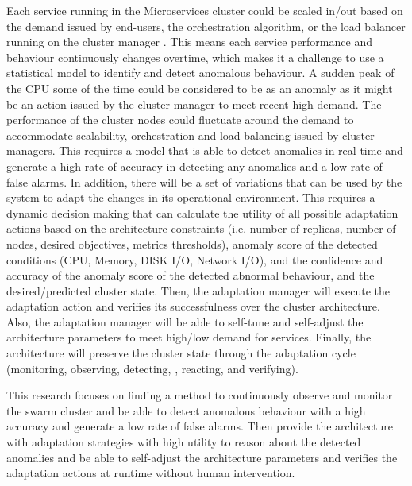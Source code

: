 \documentclass[sigconf]{acmart}
\begin{document}
Each service running in the Microservices cluster could be scaled in/out based on the demand issued by end-users, the orchestration algorithm, or the load balancer running on the cluster manager \cite{stubbs2015distributed}. This means each service performance and behaviour continuously changes overtime, which makes it a challenge to use a statistical model to identify and detect anomalous behaviour. A sudden peak of the CPU some of the time could be considered to be as an anomaly as it might be an action issued by the cluster manager to meet recent high demand. The performance of the cluster nodes could fluctuate around the demand to accommodate scalability, orchestration and load balancing issued by cluster managers. This requires a model that is able to detect anomalies in real-time and generate a high rate of accuracy in detecting any anomalies and a low rate of false alarms. In addition, there will be a set of variations that can be used by the system to adapt the changes in its operational environment. This requires a dynamic decision making that can calculate the utility of all possible adaptation actions based on the architecture constraints (i.e. number of replicas, number of nodes, desired objectives, metrics thresholds), anomaly score of the detected conditions (CPU, Memory, DISK I/O, Network I/O), and the confidence and accuracy of the anomaly score of the detected abnormal behaviour, and the desired/predicted cluster state. Then, the adaptation manager will execute the adaptation action and verifies its successfulness over the cluster architecture. Also, the adaptation manager will be able to self-tune and self-adjust the architecture parameters to meet high/low demand for services. Finally, the architecture will preserve the cluster state through the adaptation cycle (monitoring, observing, detecting, , reacting, and verifying).

 This research focuses on finding a method to continuously observe and monitor the swarm cluster and be able to detect anomalous behaviour with a high accuracy and generate a low rate of false alarms. Then provide the architecture with adaptation strategies with high utility to reason about the detected anomalies and be able to self-adjust the architecture parameters and verifies the adaptation actions at runtime without human intervention.
\end{document}
